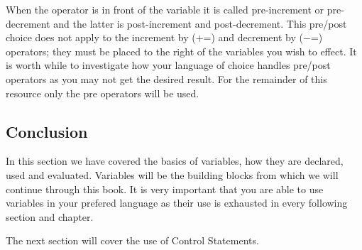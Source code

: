 When the operator is in front of the variable it is called pre-increment or pre-decrement and the latter is post-increment and post-decrement.
This pre/post choice does not apply to the increment by (+=) and decrement by ($-$=) operators; they must be placed to the right of the variables you wish to effect.
It is worth while to investigate how your language of choice handles pre/post operators as you may not get the desired result.
For the remainder of this resource only the pre operators will be used.


\subsection{Conclusion}
In this section we have covered the basics of variables, how they are declared, used and evaluated.
Variables will be the building blocks from which we will continue through this book.
It is very important that you are able to use variables in your prefered language as their use is exhausted in every following section and chapter.
\par

The next section will cover the use of Control Statements.
